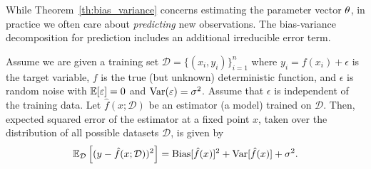 While Theorem~\ref{th:bias_variance} concerns estimating the parameter vector $\theta$, 
in practice we often care about \emph{predicting} new observations. The bias-variance 
decomposition for prediction includes an additional irreducible error term.

\begin{corollary}\label{cor:bias_variance_prediction}
Assume we are given a training set $\mathcal{D} = \{(x_i, y_i)\}_{i=1}^n$ where $y_i = f(x_i) + \epsilon$ is the target variable, $f$ is the true (but unknown) deterministic function, and $\epsilon$ is random noise  with $\mathbb{E}[\varepsilon] = 0$ and $\operatorname{Var}(\varepsilon) = \sigma^2$. Assume that $\epsilon$ is independent of the training data.
Let $\hat{f}(x; \mathcal{D})$ be an estimator (a model) trained on $\mathcal{D}$. Then,
expected squared error of the estimator at a fixed point $x$, taken over the distribution of all possible datasets $\mathcal{D}$, is given by
\begin{equation}\label{eq:prediction_mse}
\mathbb{E}_\mathcal{D} \left[ (y - \hat{f}(x; \mathcal{D}))^2 \right] = \operatorname{Bias}[\hat{f}(x)]^2 + \operatorname{Var}[\hat{f}(x)] + \sigma^2.
\end{equation}

\end{corollary}

